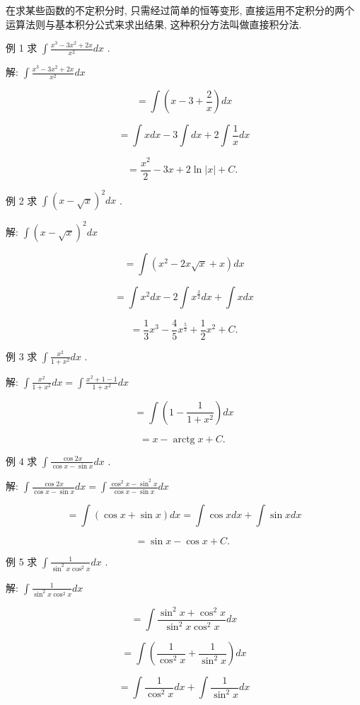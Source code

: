 \documentclass[lang=cn,newtx,10pt,scheme=chinese]{elegantbook}
\begin{document}
在求某些函数的不定积分时, 只需经过简单的恒等变形, 直接运用不定积分的两个运算法则与基本积分公式来求出结果, 这种积分方法叫做直接积分法.

例 1 求 \(\int \frac{{x}^{3} - 3{x}^{2} + {2x}}{{x}^{2}}{dx}\) .

解: \(\int \frac{{x}^{3} - 3{x}^{2} + {2x}}{{x}^{2}}{dx}\)

\[
= \int \left( {x - 3 + \frac{2}{x}}\right) {dx}
\]

\[
= \int {xdx} - 3\int {dx} + 2\int \frac{1}{x}{dx}
\]

\[
= \frac{{x}^{2}}{2} - {3x} + 2\ln \left| x\right| + C\text{. }
\]

例 2 求 \(\int {\left( x - \sqrt{x}\right) }^{2}{dx}\) .

解: \(\int {\left( x - \sqrt{x}\right) }^{2}{dx}\)

\[
= \int \left( {{x}^{2} - {2x}\sqrt{x} + x}\right) {dx}
\]

\[
= \int {x}^{2}{dx} - 2\int {x}^{\frac{3}{2}}{dx} + \int {xdx}
\]

\[
= \frac{1}{3}{x}^{3} - \frac{4}{5}{x}^{\frac{5}{2}} + \frac{1}{2}{x}^{2} + C.
\]

例 3 求 \(\int \frac{{x}^{2}}{1 + {x}^{2}}{dx}\) .

解: \(\int \frac{{x}^{2}}{1 + {x}^{2}}{dx} = \int \frac{{x}^{2} + 1 - 1}{1 + {x}^{2}}{dx}\)

\[
= \int \left( {1 - \frac{1}{1 + {x}^{2}}}\right) {dx}
\]

\[
= x - \operatorname{arctg}x + C\text{. }
\]

例 4 求 \(\int \frac{\cos {2x}}{\cos x - \sin x}{dx}\) .

解: \(\int \frac{\cos {2x}}{\cos x - \sin x}{dx} = \int \frac{{\cos }^{2}x - {\sin }^{2}x}{\cos x - \sin x}{dx}\)

\[
= \int \left( {\cos x + \sin x}\right) {dx} = \int \cos {xdx} + \int \sin {xdx}
\]

\[
= \sin x - \cos x + C\text{. }
\]

例 5 求 \(\int \frac{1}{{\sin }^{2}x{\cos }^{2}x}{dx}\) .

解: \(\int \frac{1}{{\sin }^{2}x{\cos }^{2}x}{dx}\)

\[
= \int \frac{{\sin }^{2}x + {\cos }^{2}x}{{\sin }^{2}x{\cos }^{2}x}{dx}
\]

\[
= \int \left( {\frac{1}{{\cos }^{2}x} + \frac{1}{{\sin }^{2}x}}\right) {dx}
\]

\[
= \int \frac{1}{{\cos }^{2}x}{dx} + \int \frac{1}{{\sin }^{2}x}{dx}
\]
\end{document}
